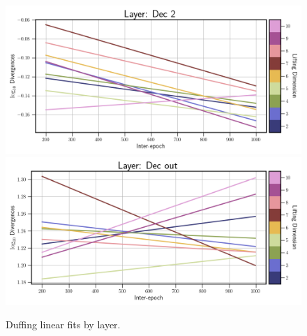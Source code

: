 \begin{figure}[!htbp]
\begin{minipage}{.5\textwidth}
        \includegraphics[width=\textwidth]{"../Figures/duffing_div_plot_linear_dec_2.png"} 
        \includegraphics[width=\textwidth]{"../Figures/duffing_div_plot_linear_dec_out.png"} 
    \end{minipage}
    \caption{Duffing linear fits by layer.}
    \label{fig:duffing linear fits all layers}
\end{figure}

